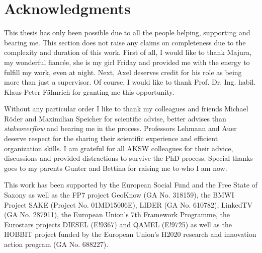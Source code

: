 



\bigskip

\begingroup
\let\clearpage\relax
\let\cleardoublepage\relax
\let\cleardoublepage\relax
\chapter*{Acknowledgments}
This thesis has only been possible due to all the people helping, supporting and bearing me.
This section does not raise any claims on completeness due to the complexity and duration of this work.
First of all, I would like to thank Majura, my wonderful fiancée, she is my girl Friday and provided me with the energy to fulfill my work, even at night.
Next, Axel deserves credit for his role as being more than just a supervisor. 
Of course, I would like to thank Prof. Dr. Ing. habil. Klaus-Peter F\"ahnrich for granting me this opportunity.
 
\bigskip

Without any particular order I like to thank my colleagues and friends Michael Röder and Maximilian Speicher for scientific advise, better advises than \emph{stakeoverflow} and bearing me in the process. 
Professors Lehmann and Auer deserve respect for the sharing their scientific experience and efficient organization skills. 
I am grateful for all AKSW colleagues for their advice, discussions and provided distractions to survive the PhD process. 
Special thanks goes to my parents Gunter and Bettina for raising me to who I am now. 


\bigskip


This work has been supported by the European Social Fund and the Free State of Saxony as well as the FP7 project GeoKnow (GA No. 318159), the BMWI Project SAKE (Project No. 01MD15006E), LIDER (GA No. 610782), LinkedTV (GA No. 287911), the European Union's 7th Framework Programme, the Eurostars projects DIESEL (E!9367) and QAMEL (E!9725) as well as the HOBBIT project funded by the European Union's H2020 research and innovation action program (GA No. 688227).


\endgroup



